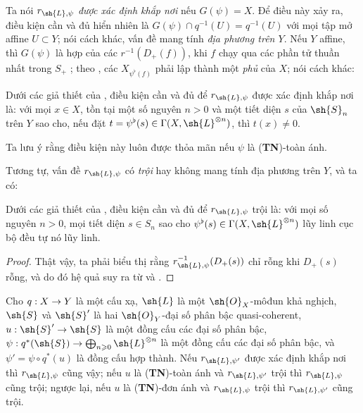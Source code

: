 \documentclass[oneside,10pt]{amsart}
\makeatletter
\renewcommand{\geq}{\geqslant}
\newcommand{\ega@arrow}[2]{\mathchoice{#1}{#2}{#2}{#2}}
\renewcommand{\to}{\ega@arrow{\longrightarrow}{\rightarrow}}
\newcommand{\oldpage}[2][]{\marginnote{\normalfont\footnotesize\textbf{#1}~|~#2}\ignorespaces}
\let\EGAOriginalLabel\label
\renewcommand{\label}[1]{\phantomsection\EGAOriginalLabel{#1}}
\makeatother
\begin{document}
Ta nói $r_{\sh{L},\psi}$ \emph{được xác định khắp nơi} nếu $G(\psi)=X$.
Để điều này xảy ra, điều kiện cần và đủ hiển nhiên là $G(\psi)\cap q^{-1}(U)=q^{-1}(U)$ với mọi tập mở affine $U\subset Y$;
nói cách khác, vấn đề mang tính \emph{địa phương trên $Y$}.
Nếu $Y$ affine, thì $G(\psi)$ là hợp của các $r^{-1}(D_+(f))$, khi $f$ chạy qua các phần tử thuần nhất trong $S_+$ ;
theo , các $X_{\psi^\flat(f)}$ phải lập thành một \emph{phủ} của $X$;
nói cách khác:

\begin{corollary}[3.7.4]
\label{II.3.7.4}
Dưới các giả thiết của , điều kiện cần và đủ để $r_{\sh{L},\psi}$ được xác định khắp nơi là: với mọi $x\in X$, tồn tại một số nguyên $n>0$ và một tiết diện $s$ của $\sh{S}_n$ trên $Y$ sao cho, nếu đặt $t=\psi^\flat(s)\in\Gamma(X,\sh{L}^{\otimes n})$, thì $t(x)\neq0$.
\end{corollary}
\oldpage[II]{67}

Ta lưu ý rằng điều kiện này luôn được thỏa mãn nếu $\psi$ là (\textbf{TN})-toàn ánh.

Tương tự, vấn đề $r_{\sh{L},\psi}$ có \emph{trội} hay không mang tính địa phương trên $Y$, và ta có:

\begin{corollary}[3.7.5]
\label{II.3.7.5}
Dưới các giả thiết của , điều kiện cần và đủ để $r_{\sh{L},\psi}$ trội là: với mọi số nguyên $n>0$, mọi tiết diện $s\in S_n$ sao cho $\psi^\flat(s)\in\Gamma(X,\sh{L}^{\otimes n})$ lũy linh cục bộ đều tự nó lũy linh.
\end{corollary}

\begin{proof}
Thật vậy, ta phải biểu thị rằng $r_{\sh{L},\psi}^{-1}(D_+(s))$ chỉ rỗng khi $D_+(s)$ rỗng, và do đó hệ quả suy ra từ  và .
\end{proof}

\begin{proposition}[3.7.6]
\label{II.3.7.6}
Cho $q:X\to Y$ là một cấu xạ, $\sh{L}$ là một $\sh{O}_X$-môđun khả nghịch, $\sh{S}$ và $\sh{S}'$ là hai $\sh{O}_Y$-đại số phân bậc quasi-coherent, $u:\sh{S}'\to\sh{S}$ là một đồng cấu các đại số phân bậc, $\psi:q^*(\sh{S})\to\bigoplus_{n\geq0}\sh{L}^{\otimes n}$ là một đồng cấu các đại số phân bậc, và $\psi'=\psi\circ q^*(u)$ là đồng cấu hợp thành.
Nếu $r_{\sh{L},\psi'}$ được xác định khắp nơi thì $r_{\sh{L},\psi}$ cũng vậy;
nếu $u$ là (\textbf{TN})-toàn ánh và $r_{\sh{L},\psi'}$ trội thì $r_{\sh{L},\psi}$ cũng trội;
ngược lại, nếu $u$ là (\textbf{TN})-đơn ánh và $r_{\sh{L},\psi}$ trội thì $r_{\sh{L},\psi'}$ cũng trội.
\end{proposition}
\end{document}

